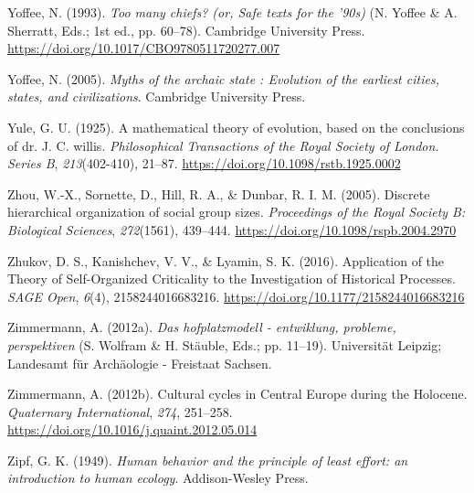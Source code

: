 \documentclass[
  12pt,
]{book}
\newlength{\cslhangindent}
\newlength{\cslentryspacingunit} %
\newenvironment{CSLReferences}[2] %
 {%
  \setlength{\parindent}{0pt}
  \ifodd #1
  \let\oldpar\par
  \def\par{\hangindent=\cslhangindent\oldpar}
  \fi
  \setlength{\parskip}{#2\cslentryspacingunit}
 }%
 {}
\begin{document}
\begin{CSLReferences}{1}{0}
\leavevmode{}%
Yoffee, N. (1993). \emph{Too many chiefs? (or, Safe texts for the '90s)} (N. Yoffee \& A. Sherratt, Eds.; 1st ed., pp. 60--78). Cambridge University Press. \url{https://doi.org/10.1017/CBO9780511720277.007}

\leavevmode{}%
Yoffee, N. (2005). \emph{Myths of the archaic state : Evolution of the earliest cities, states, and civilizations}. Cambridge University Press.

\leavevmode{}%
Yule, G. U. (1925). A mathematical theory of evolution, based on the conclusions of dr. J. C. willis. \emph{Philosophical Transactions of the Royal Society of London. Series B}, \emph{213}(402-410), 21--87. \url{https://doi.org/10.1098/rstb.1925.0002}

\leavevmode{}%
Zhou, W.-X., Sornette, D., Hill, R. A., \& Dunbar, R. I. M. (2005). Discrete hierarchical organization of social group sizes. \emph{Proceedings of the Royal Society B: Biological Sciences}, \emph{272}(1561), 439--444. \url{https://doi.org/10.1098/rspb.2004.2970}

\leavevmode{}%
Zhukov, D. S., Kanishchev, V. V., \& Lyamin, S. K. (2016). Application of the {Theory} of {Self-Organized Criticality} to the {Investigation} of {Historical Processes}. \emph{SAGE Open}, \emph{6}(4), 2158244016683216. \url{https://doi.org/10.1177/2158244016683216}

\leavevmode{}%
Zimmermann, A. (2012a). \emph{Das hofplatzmodell - entwiklung, probleme, perspektiven} (S. Wolfram \& H. Stäuble, Eds.; pp. 11--19). Universität Leipzig; Landesamt für Archäologie - Freistaat Sachsen.

\leavevmode{}%
Zimmermann, A. (2012b). Cultural cycles in {Central Europe} during the {Holocene}. \emph{Quaternary International}, \emph{274}, 251--258. \url{https://doi.org/10.1016/j.quaint.2012.05.014}

\leavevmode{}%
Zipf, G. K. (1949). \emph{Human behavior and the principle of least effort: an introduction to human ecology}. Addison-Wesley Press.

\end{CSLReferences}

\hypertarget{appendix-appendix}{%
\appendix {}}
\end{document}
